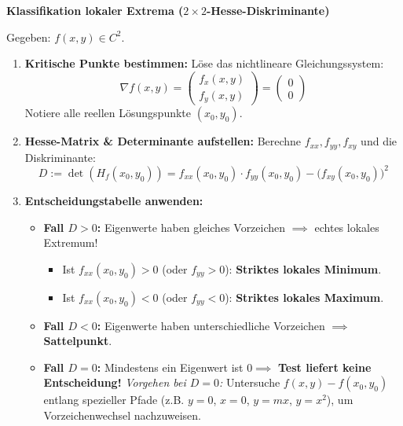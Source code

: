\begin{example}
    \textbf{Klassifikation lokaler Extrema ($2 \times 2$-Hesse-Diskriminante)}
    
    Gegeben: $f(x, y) \in C^2$.
    \begin{enumerate}
        \item \textbf{Kritische Punkte bestimmen:} Löse das nichtlineare Gleichungssystem:
        $$ \nabla f(x, y) = \begin{pmatrix} f_x(x, y) \\ f_y(x, y) \end{pmatrix} = \begin{pmatrix} 0 \\ 0 \end{pmatrix} $$
        Notiere alle reellen Lösungspunkte $(x_0, y_0)$.
        \item \textbf{Hesse-Matrix \& Determinante aufstellen:} Berechne $f_{xx}, f_{yy}, f_{xy}$ und die Diskriminante:
        $$ D := \det(H_f(x_0, y_0)) = f_{xx}(x_0, y_0) \cdot f_{yy}(x_0, y_0) - \big( f_{xy}(x_0, y_0) \big)^2 $$
        \item \textbf{Entscheidungstabelle anwenden:}
        \begin{itemize}
            \item \textbf{Fall $D > 0$:} Eigenwerte haben gleiches Vorzeichen $\implies$ echtes lokales Extremum!
            \begin{itemize}
                \item Ist $f_{xx}(x_0, y_0) > 0$ (oder $f_{yy} > 0$): \textbf{Striktes lokales Minimum}.
                \item Ist $f_{xx}(x_0, y_0) < 0$ (oder $f_{yy} < 0$): \textbf{Striktes lokales Maximum}.
            \end{itemize}
            \item \textbf{Fall $D < 0$:} Eigenwerte haben unterschiedliche Vorzeichen $\implies$ \textbf{Sattelpunkt}.
            \item \textbf{Fall $D = 0$:} Mindestens ein Eigenwert ist $0 \implies$ \textbf{Test liefert keine Entscheidung!}
            \textit{Vorgehen bei $D = 0$:} Untersuche $f(x, y) - f(x_0, y_0)$ entlang spezieller Pfade (z.B. $y = 0$, $x = 0$, $y = mx$, $y = x^2$), um Vorzeichenwechsel nachzuweisen.
        \end{itemize}
    \end{enumerate}
\end{example}


